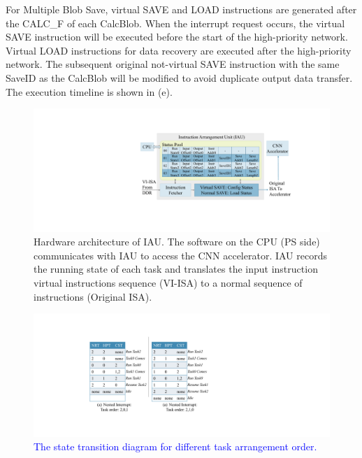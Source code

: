 For Multiple Blob Save, virtual SAVE and LOAD instructions are generated after the CALC\_F of each CalcBlob. When the interrupt request occurs, the virtual SAVE instruction will be executed before the start of the high-priority network. Virtual LOAD instructions for data recovery are executed after the high-priority network. The subsequent original not-virtual SAVE instruction with the same SaveID as the CalcBlob will be modified to avoid duplicate output data transfer. The execution timeline is shown in (e).


\begin{figure}[t]
	\centering
	\includegraphics[width=0.99\linewidth]{fig/iau.pdf}
	\vspace{-6mm}
	\caption{Hardware architecture of IAU. The software on the CPU (PS side) communicates with IAU to access the CNN accelerator. IAU records the running state of each task and translates the input instruction virtual instructions sequence (VI-ISA) to a normal sequence of instructions (Original ISA).
	}
	\label{fig:IAU}
\end{figure}

\begin{figure}[t]
	\centering
	\includegraphics[width=0.8\linewidth]{fig/nestedinter.pdf}
	\vspace{-0mm}
	\caption{
		\textcolor{blue}{The state transition diagram for different task arrangement order.
		}
	}
	\label{fig:nestedinter}
\end{figure}

